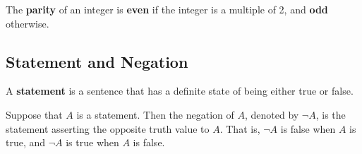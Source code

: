 \begin{definition}
    The \textbf{parity} of an integer is \textbf{even} if the integer is a multiple of 2, and \textbf{odd} otherwise. 
\end{definition}

\subsection{Statement and Negation}
\begin{definition}[Statement]
    A \textbf{statement} is a sentence that has a definite state of being either true or false. 
\end{definition}

\begin{definition}[Negation]
    Suppose that $A$ is a statement. Then the negation of $A$, denoted by $\neg A$, is the statement 
    asserting the opposite truth value to $A$. That is, $\neg A$ is false when $A$ is true, and $\neg A$ is true 
    when $A$ is false. 
\end{definition}
